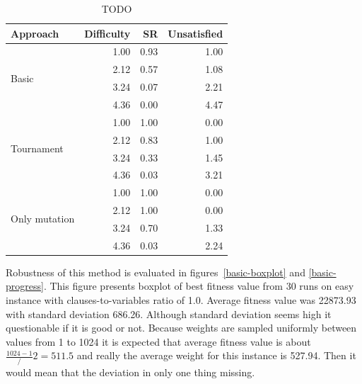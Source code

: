 \documentclass{article}
\begin{document}
\begin{table}[ht]
\caption{TODO}
\label{result-table}
\vskip 0.15in
\begin{center}
\begin{small}
\begin{sc}
\begin{tabular}{lrrr}
\toprule
Approach & Difficulty & SR & Unsatisfied \\
\midrule
\multirow{4}{*}{Basic} & 1.00 & 0.93 & 1.00 \\
                       & 2.12 & 0.57 & 1.08 \\
                       & 3.24 & 0.07 & 2.21 \\
                       & 4.36 & 0.00 & 4.47 \\
\midrule
\multirow{4}{*}{Tournament} & 1.00 & 1.00 & 0.00 \\
                            & 2.12 & 0.83 & 1.00 \\
                            & 3.24 & 0.33 & 1.45 \\
                            & 4.36 & 0.03 & 3.21 \\
\midrule
\multirow{4}{*}{Only mutation} & 1.00 & 1.00 & 0.00 \\
                               & 2.12 & 1.00 & 0.00 \\
                               & 3.24 & 0.70 & 1.33 \\
                               & 4.36 & 0.03 & 2.24 \\
\bottomrule
\end{tabular}
\end{sc}
\end{small}
\end{center}
\vskip -0.1in
\end{table}

Robustness of this method is evaluated in figures~\ref{basic-boxplot}
and \ref{basic-progress}.
This figure presents boxplot of best fitness value from 30 runs
on easy instance with clauses-to-variables ratio of 1.0.
Average fitness value was 22873.93 with standard deviation 686.26.
Although standard deviation seems high it questionable if it is good or not.
Because weights are sampled uniformly between values from 1 to 1024
it is expected that average fitness value is about
$\frac{1024 - 1} / 2 = 511.5$
and really the average weight for this instance is 527.94.
Then it would mean that the deviation in only one thing missing.
\end{document}

